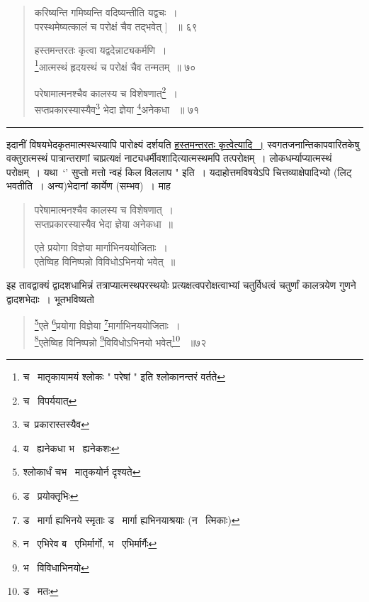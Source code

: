 \documentclass[11pt, openany]{book}
\begin{document}
{\begin{quote}
{करिष्यन्ति गमिष्यन्ति वदिष्यन्तीति यद्वचः~।\\ 
परस्थमेष्यत्कालं च परोक्षं चैव तद्भवेत् ] ~॥ ६९ 

हस्तमन्तरतः कृत्वा यद्वदेन्नाट्यकर्मणि~।\\ 
\renewcommand{\thefootnote}{1}\footnote{च \textendash\ मातृकायामयं श्लोकः " परेषां " इति श्लोकानन्तरं वर्तते }आत्मस्थं हृदयस्थं च परोक्षं चैव तन्मतम्~॥ ७० 

परेषामात्मनश्चैव कालस्य च विशेषणात्\renewcommand{\thefootnote}{2}\footnote{च \textendash\ विपर्ययात् }~।\\ 
सप्तप्रकारस्यास्यैव\renewcommand{\thefootnote}{3}\footnote{च\textendash\ प्रकारास्तस्यैव } भेदा ज्ञेया \renewcommand{\thefootnote}{4}\footnote{य \textendash\ ह्यनेकधा भ \textendash\ ह्यनेकशः }अनेकधा ~॥ ७१ }
\end{quote}

\hrule

\vspace{2mm}

इदानीं विषयभेदकृतमात्मस्थस्यापि पारोक्ष्यं दर्शयति \underline{हस्तमन्तरतः कृत्वेत्यादि~।} स्वगतजनान्तिकापवारितकेषु वक्तुरात्मस्थं पात्रान्तराणां चाप्रत्यक्षं नाट्यधर्मीवशादित्यात्मस्थमपि तत्परोक्षम्~। लोकधर्म्याप्यात्मस्थं परोक्षम्~। यथा\textendash\ `' सुप्तो मत्तो न्वहं किल विललाप " इति~। यदाहोत्तमविषयेऽपि चित्तव्याक्षेपादिभ्यो (लिट् भवतीति~। अन्य)भेदानां कार्येण (सम्भव)~। माह\textendash\ 

\begin{quote}
 {\qt परेषामात्मनश्चैव कालस्य च विशेषणात्~। \\
सप्तप्रकारस्यास्यैव भेदा ज्ञेया अनेकधा~॥ 

एते प्रयोगा विज्ञेया मार्गाभिनययोजिताः~।\\ 
एतेष्विह विनिष्पन्नो विविधोऽभिनयो भवेत्~॥ }
\end{quote}

इह तावद्वाक्यं द्वादशधाभिन्नं तत्राप्यात्मस्थपरस्थयोः प्रत्यक्षत्वपरोक्षत्वाभ्यां चतुर्विधत्वं चतुर्णां कालत्रयेण गुणने द्वादशभेदाः~। भूतभविष्यतो\textendash\ 

\newpage

\begin{quote}
 {\na \renewcommand{\thefootnote}{1}\footnote{श्लोकार्धं चभ \textendash\ मातृकयोर्न दृश्यते }एते \renewcommand{\thefootnote}{2}\footnote{ड \textendash\ प्रयोक्तृभिः }प्रयोगा विज्ञेया \renewcommand{\thefootnote}{3}\footnote{ड \textendash\ मार्गा ह्यभिनये स्मृताः ड \textendash\ मार्गा ह्यभिनयाश्रयाः (न \textendash\ त्मिकाः) }मार्गाभिनययोजिताः~। \\
\renewcommand{\thefootnote}{4}\footnote{न \textendash\ एभिरेव ब \textendash\ एभिर्मार्गो, भ \textendash\ एभिर्मार्गैः }एतेष्विह विनिष्पन्नो \renewcommand{\thefootnote}{5}\footnote{भ \textendash\ विविधाभिनयो}विविधोऽभिनयो भवेत्\renewcommand{\thefootnote}{6}\footnote{ड \textendash\ मतः } ~॥७२ 

}
\end{quote}}
\end{document}
